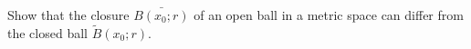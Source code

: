 Show that the closure $\bar{B(x_0;r)}$ of an open ball in a metric space can differ from the closed ball
$\tilde{B}(x_0;r)$.\\